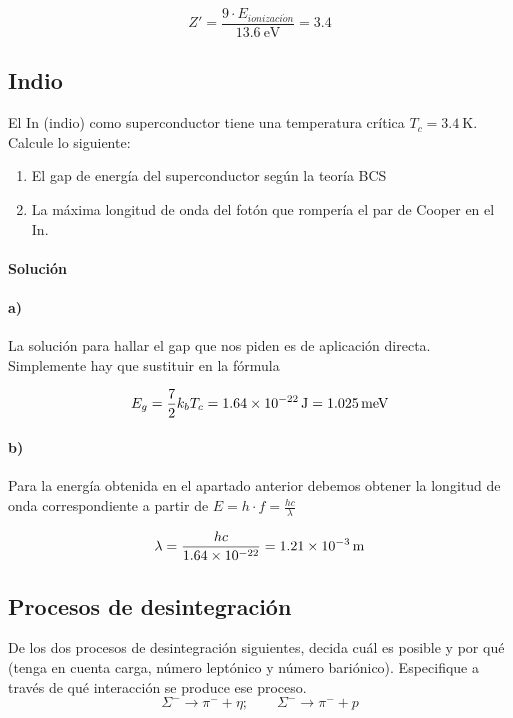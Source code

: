 \documentclass[12pt, a4paper]{article}
\begin{document}
    $$Z'=\frac{9 \cdot E_{ionizaci\acute{o}n}}{\SI{13.6}{\electronvolt}} = \num{3.4}$$

    \subsection{Indio}
    El In (indio) como superconductor tiene una temperatura crítica ${T_c=\SI{3.4}{\kelvin}}$. Calcule
    lo siguiente:
    \begin{enumerate}[label=\alph*)]
        \item El gap de energía del superconductor según la teoría BCS
        \item La máxima longitud de onda del fotón que rompería el par de Cooper en el In.
    \end{enumerate}

    \paragraph{\textbf{Solución}}
    \paragraph{a)} La solución para hallar el gap que nos piden es de aplicación directa. Simplemente hay
    que sustituir en la fórmula

    $$E_g=\frac{7}{2} k_b T_c = \SI{1.64d-22}{\J} = \SI{1.025}{\milli\electronvolt}$$

    \paragraph{b)} Para la energía obtenida en el apartado anterior debemos obtener la longitud
    de onda correspondiente a partir de $E=h\cdot f = \frac{h c}{\lambda}$

    $$\lambda = \frac{h c}{\num{1.64d-22}} = \SI{1.21d-3}{\meter}$$




    \subsection{Procesos de desintegración}
    De los dos procesos de desintegración siguientes, decida cuál es posible y por qué
    (tenga en cuenta carga, número leptónico y número bariónico). Especifique a través
    de qué interacción se produce ese proceso.
    $$\Sigma^{-} \rightarrow \pi^{-} + \eta;   \quad \quad \Sigma^{-} \rightarrow \pi^{-} + p$$
\end{document}
